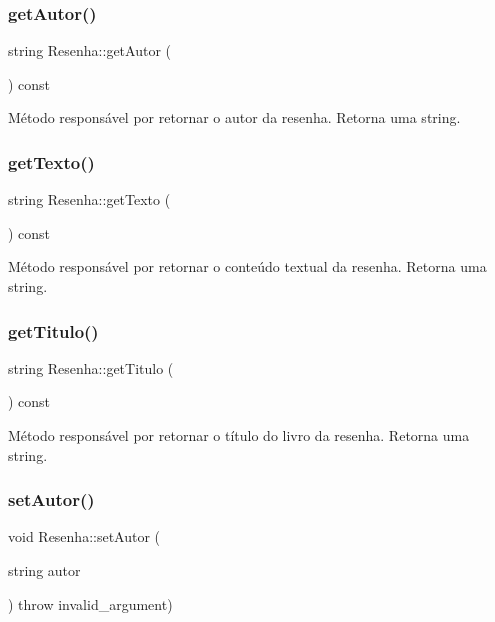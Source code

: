\subsubsection{\texorpdfstring{get\+Autor()}{getAutor()}}
{\footnotesize\ttfamily string Resenha\+::get\+Autor (\begin{DoxyParamCaption}{ }\end{DoxyParamCaption}) const\hspace{0.3cm}{\ttfamily [inline]}}

Método responsável por retornar o autor da resenha. Retorna uma string. \mbox{\label{classResenha_a17b193d598f0b50f90310a67afc0b524}} 
\subsubsection{\texorpdfstring{get\+Texto()}{getTexto()}}
{\footnotesize\ttfamily string Resenha\+::get\+Texto (\begin{DoxyParamCaption}{ }\end{DoxyParamCaption}) const\hspace{0.3cm}{\ttfamily [inline]}}

Método responsável por retornar o conteúdo textual da resenha. Retorna uma string. \mbox{\label{classResenha_a8c0966bc51ba8d43c769594446797d9f}} 
\subsubsection{\texorpdfstring{get\+Titulo()}{getTitulo()}}
{\footnotesize\ttfamily string Resenha\+::get\+Titulo (\begin{DoxyParamCaption}{ }\end{DoxyParamCaption}) const\hspace{0.3cm}{\ttfamily [inline]}}

Método responsável por retornar o título do livro da resenha. Retorna uma string. \mbox{\label{classResenha_a5c12319c40b3001ba8b6771e2a86285b}} 
\subsubsection{\texorpdfstring{set\+Autor()}{setAutor()}}
{\footnotesize\ttfamily void Resenha\+::set\+Autor (\begin{DoxyParamCaption}\item[{string}]{autor }\end{DoxyParamCaption}) throw  invalid\+\_\+argument) \hspace{0.3cm}{\ttfamily [inline]}}


